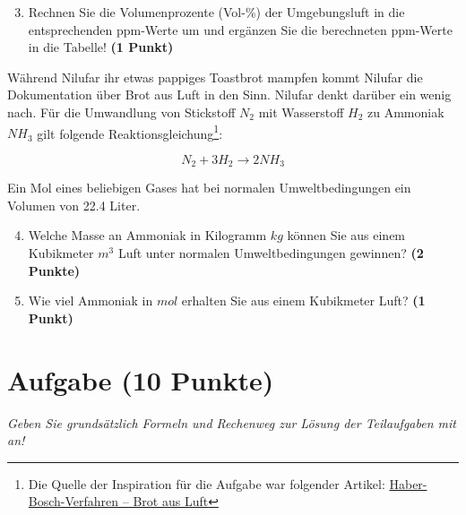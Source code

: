 \documentclass[a4paper, 9pt]{scrartcl}\usepackage[]{graphicx}\usepackage[]{xcolor}
\begin{document}
\begin{enumerate}
   \setcounter{enumi}{2}
\item Rechnen Sie die Volumenprozente (Vol-\%) der Umgebungsluft in die entsprechenden ppm-Werte um und ergänzen Sie die berechneten ppm-Werte in die Tabelle!  \textbf{(1 Punkt)}
\end{enumerate}

Während Nilufar ihr etwas pappiges Toastbrot mampfen kommt Nilufar die Dokumentation über Brot aus Luft in den Sinn. Nilufar denkt darüber ein wenig nach. Für die Umwandlung von Stickstoff $N_2$ mit Wasserstoff $H_2$ zu Ammoniak $NH_3$ gilt folgende Reaktionsgleichung\footnote{Die Quelle der Inspiration für die Aufgabe war folgender Artikel: \href{https://www.gdch.de/netzwerk-strukturen/fachstrukturen/ag-chemie-und-gesellschaft/projekte-und-veranstaltungen/cartoons/haber-bosch-verfahren-brot-aus-luft.html}{Haber-Bosch-Verfahren – Brot aus Luft}}:

\begin{equation*}
  N_2 + 3H_2 \rightarrow 2NH_3
\end{equation*}  

Ein Mol eines beliebigen Gases hat bei normalen Umweltbedingungen ein Volumen von 22.4 Liter. %

\begin{enumerate}
  \setcounter{enumi}{3}
\item Welche Masse an Ammoniak in Kilogramm $kg$ können Sie aus einem Kubikmeter $m^3$ Luft unter normalen Umweltbedingungen gewinnen?
  \textbf{(2 Punkte)}
\item Wie viel Ammoniak in $mol$ erhalten Sie aus einem Kubikmeter Luft? \textbf{(1 Punkt)}
\end{enumerate}

 
\clearpage

\section{Aufgabe \hfill (10 Punkte)}

\textit{Geben Sie grundsätzlich Formeln und Rechenweg zur Lösung der Teilaufgaben mit an!} \\[1Ex]
 
\end{document}
